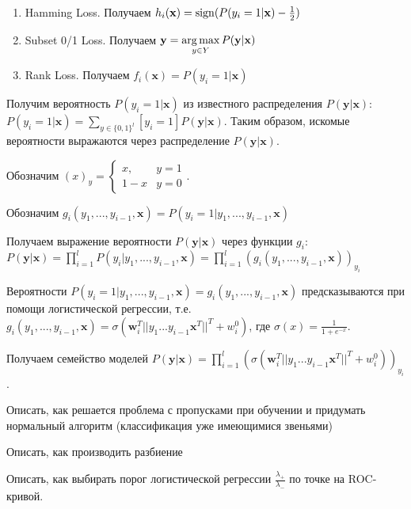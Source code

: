 \documentclass[12pt,twoside]{article}
\newcommand{\x}{\mathbf{x}}
\newcommand{\w}{\mathbf{w}}
\newcommand{\y}{\mathbf{y}}
\begin{document}
\begin{enumerate}
\item Hamming Loss. Получаем $h_i(\x)=\sign(P(y_i=1|\x)-\frac{1}{2})$
\item Subset 0/1 Loss. Получаем $\y=\argmax_{y\in Y}P(\y|\x)$
\item Rank Loss. Получаем $f_i(\x)=P(y_i=1|\x)$
\end{enumerate}

Получим вероятность $P(y_i=1|\x)$ из известного распределения $P(\y|\x)$: $P(y_i=1|\x)=\sum\limits_{y\in \{0,1\}^l}[y_i=1]P(\y|\x)$. Таким образом, искомые вероятности выражаются через распределение $P(\y|\x)$.

Обозначим $(x)_{y}=\begin{cases}
x, & y = 1\\
1 - x & y = 0
\end{cases}$.

Обозначим $g_i(y_1,...,y_{i-1},\x)=P(y_i=1|y_1,...,y_{i-1},\x)$

Получаем выражение вероятности $P(\y|\x)$ через функции $g_i$: $P(\y|\x)=\prod\limits_{i=1}^lP(y_i|y_1,...,y_{i-1},\x)=\prod\limits_{i=1}^l(g_i(y_1,...,y_{i-1},\x))_{y_i}$

Вероятности $P(y_i=1|y_1,...,y_{i-1},\x)=g_i(y_1,...,y_{i-1},\x)$ предсказываются при помощи логистической регрессии, т.е. $g_i(y_1,...,y_{i-1},\x)=\sigma(\w_i^T||y_1...y_{i-1}\x^T||^T+w^0_i)$, где $\sigma(x)=\frac{1}{1+e^{-x}}$.

Получаем семейство моделей $P(\y|\x)=\prod\limits_{i=1}^l(\sigma(\w_i^T||y_1...y_{i-1}\x^T||^T+w^0_i))_{y_i}$.

Описать, как решается проблема с пропусками при обучении и придумать нормальный алгоритм (классификация уже имеющимися звеньями)

Описать, как производить разбиение

Описать, как выбирать порог логистической регрессии $\frac{\lambda_+}{\lambda_-}$ по точке на ROC-кривой.
\end{document}
